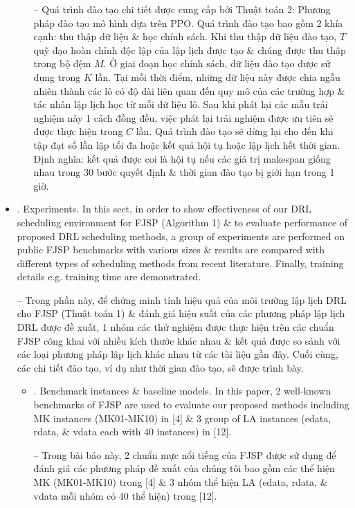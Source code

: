 \documentclass{article}
\begin{document}
\begin{itemize}
\begin{itemize}
        -- Quá trình đào tạo chi tiết được cung cấp bởi {\sf Thuật toán 2: Phương pháp đào tạo mô hình dựa trên PPO}. Quá trình đào tạo bao gồm 2 khía cạnh: thu thập dữ liệu \& học chính sách. Khi thu thập dữ liệu đào tạo, $T$ quỹ đạo hoàn chỉnh độc lập của lập lịch được tạo \& chúng được thu thập trong bộ đệm $M$. Ở giai đoạn học chính sách, dữ liệu đào tạo được sử dụng trong $K$ lần. Tại mỗi thời điểm, những dữ liệu này được chia ngẫu nhiên thành các lô có độ dài liên quan đến quy mô của các trường hợp \& tác nhân lập lịch học từ mỗi dữ liệu lô. Sau khi phát lại các mẫu trải nghiệm này 1 cách đồng đều, việc phát lại trải nghiệm được ưu tiên sẽ được thực hiện trong $C$ lần. Quá trình đào tạo sẽ dừng lại cho đến khi tập đạt số lần lặp tối đa hoặc kết quả hội tụ hoặc lập lịch hết thời gian. Định nghĩa: kết quả được coi là hội tụ nếu các giá trị makespan giống nhau trong 30 bước quyết định \& thời gian đào tạo bị giới hạn trong 1 giờ.
    \end{itemize}
    \item {. Experiments.} In this sect, in order to show effectiveness of our DRL scheduling environment for FJSP (Algorithm 1) \& to evaluate performance of proposed DRL scheduling methods, a group of experiments are performed on public FJSP benchmarks with various sizes \& results are compared with different types of scheduling methods from recent literature. Finally, training details e.g. training time are demonstrated.

    -- Trong phần này, để chứng minh tính hiệu quả của môi trường lập lịch DRL cho FJSP (Thuật toán 1) \& đánh giá hiệu suất của các phương pháp lập lịch DRL được đề xuất, 1 nhóm các thử nghiệm được thực hiện trên các chuẩn FJSP công khai với nhiều kích thước khác nhau \& kết quả được so sánh với các loại phương pháp lập lịch khác nhau từ các tài liệu gần đây. Cuối cùng, các chi tiết đào tạo, ví dụ như thời gian đào tạo, sẽ được trình bày.
    \begin{itemize}
        \item {. Benchmark instances \& baseline models.} In this paper, 2 well-known benchmarks of FJSP are used to evaluate our proposed methods including MK instances (MK01-MK10) in [4] \& 3 group of LA instances (edata, rdata, \& vdata each with 40 instances) in [12].

        -- Trong bài báo này, 2 chuẩn mực nổi tiếng của FJSP được sử dụng để đánh giá các phương pháp đề xuất của chúng tôi bao gồm các thể hiện MK (MK01-MK10) trong [4] \& 3 nhóm thể hiện LA (edata, rdata, \& vdata mỗi nhóm có 40 thể hiện) trong [12].


\end{itemize}
\end{itemize}
\end{document}
